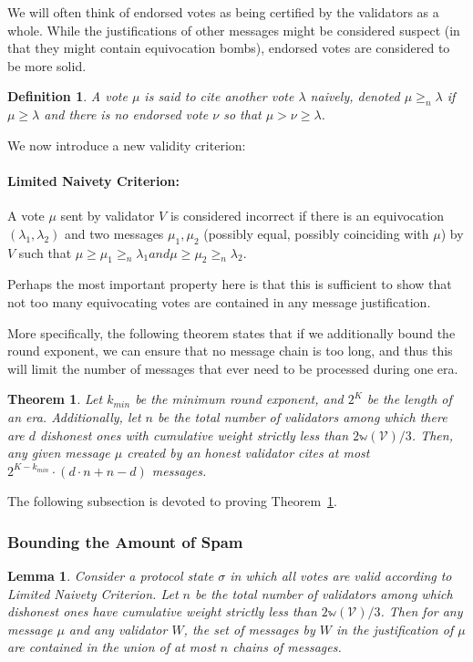 \documentclass[12pt, fleqn]{article}
\newtheorem{theorem}{Theorem}
\newtheorem{lemma}{Lemma}
\newtheorem{definition}{Definition}
\newcommand{\ww}{\mathbb{w}}
\begin{document}
We will often think of endorsed votes as being certified by the validators as a whole. While the justifications of other messages might be considered suspect (in that they might contain equivocation bombs), endorsed votes are considered to be more solid.
\begin{definition}
A vote $\mu$ is said to cite another vote $\lambda$ \emph{naively}, denoted $\mu \geq_n \lambda$ if $\mu \geq \lambda$ and there is no endorsed vote $\nu$ so that $\mu > \nu \geq \lambda$.
\end{definition}

We now introduce a new validity criterion:

\paragraph{Limited Naivety Criterion:} A vote $\mu$ sent by validator $V$ is considered incorrect if there is an equivocation $(\lambda_1, \lambda_2)$ and two messages $\mu_1, \mu_2$ (possibly equal, possibly coinciding with $\mu$) by $V$ such that $\mu \geq \mu_1 \geq_n \lambda_1 and \mu \geq \mu_2 \geq_n \lambda_2$.

Perhaps the most important property here is that this is sufficient to show that not too many equivocating votes are contained in any message justification.

More specifically, the following theorem states that if we additionally bound the round exponent, we can ensure that no message chain is too long, and thus this will limit the number of messages that ever need to be processed during one era.

\begin{theorem}\label{thm:limit_spam}
Let $k_{min}$ be the minimum round exponent, and $2^K$ be the length of an era. Additionally, let $n$ be the total number of validators among which there are $d$ dishonest ones with cumulative weight strictly less than $2\ww(\mathcal{V})/3$. Then, any given message $\mu$ created by an honest validator cites at most $2^{K-k_{min}}\cdot (d\cdot n + n-d)$ messages.
\end{theorem}
\noindent 
The following subsection is devoted to proving Theorem~\ref{thm:limit_spam}.

\subsubsection{Bounding the Amount of Spam}

\begin{lemma}\label{chainBoundLemma}
Consider a protocol state $\sigma$ in which all votes are valid according to Limited Naivety Criterion. Let $n$ be the total number of validators among which dishonest ones have cumulative weight strictly less than $2\ww(\mathcal{V})/3$. Then for any message $\mu$ and any validator $W$, the set of messages by $W$ in the justification of $\mu$ are contained in the union of at most $n$ chains of messages.
\end{lemma}
\end{document}
